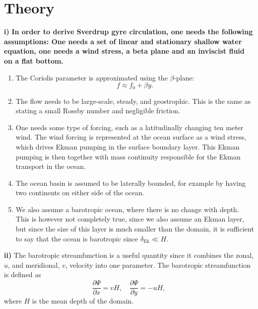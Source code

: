\section{Theory}
\textbf{i)} \textbf{In order to derive Sverdrup gyre circulation, one needs the following assumptions: One needs a set of linear and stationary shallow water equation, one needs a wind stress, a beta plane and an inviscist fluid on a flat bottom. }
\begin{enumerate}
    \item The Coriolis parameter is approximated using the $\beta$-plane:
    $$f \approx f_0 + \beta y.$$

    \item The flow needs to be large-scale, steady, and geostrophic. This is the same as stating a small Rossby number and negligible friction.

    \item One needs some type of forcing, such as a latitudinally changing ten meter wind. The wind forcing is represented at the ocean surface as a wind stress, which drives Ekman pumping in the surface boundary layer. This Ekman pumping is then together with mass continuity responsible for the Ekman transport in the ocean. 

    \item The ocean basin is assumed to be laterally bounded, for example by having two continents on either side of the ocean.

    \item We also assume a barotropic ocean, where there is no change with depth. This is however not completely true, since we also assume an Ekman layer, but since the size of this layer is much smaller than the domain, it is sufficient to say that the ocean is barotropic since $\delta_\text{Ek}\ll H$.
\end{enumerate}

\textbf{ii)} The barotropic streamfunction is a useful quantity since it combines the zonal, $u$, and meridional, $v$, velocity into one parameter. The barotropic streamfunction is defined as 
\begin{equation}
    \frac{\partial \Psi}{\partial x}=vH, \quad \frac{\partial \Psi}{\partial 
    y}=-uH,
\end{equation}
where $H$ is the mean depth of the domain.

